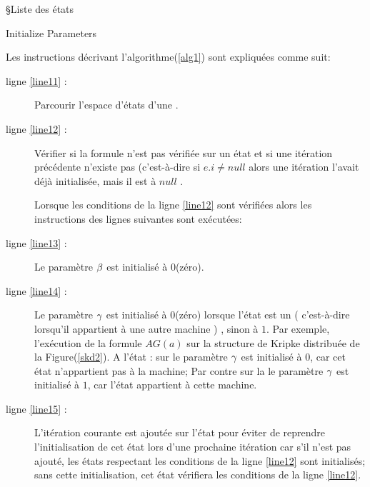 \begin{algorithm}[H]
\SetAlgoLined
{}
\S{Liste des états}
 \caption{Initialize Parameters}\label{alg1}
\end{algorithm}
Les instructions décrivant l'algorithme(\ref{alg1}) sont expliquées comme suit:
\begin{description}
	\item[ligne \ref{line11} :] Parcourir l'espace d'états d'une \mi{}.
	\item[ligne \ref{line12} :] Vérifier si la formule n'est pas vérifiée sur un état et si une itération précédente n'existe pas (c'est-à-dire si $ e.i\ne null$ alors une itération l'avait déjà initialisée, mais il est à $ null$ . 
	
	Lorsque les conditions de la ligne \ref{line12} sont vérifiées alors les instructions des lignes suivantes sont exécutées:
	\item[ligne \ref{line13} :] Le paramètre $\beta{}$ est initialisé à $0$(zéro).
	\item[ligne \ref{line14} :] Le paramètre $\gamma{}$ est initialisé à $0$(zéro) lorsque l'état est un \textsl{\border{}} ( c'est-à-dire lorsqu'il appartient à une autre machine ) , sinon à $1$. Par exemple, l'exécution de la formule  \textit{$AG(a)$} sur la structure de Kripke distribuée de la Figure(\ref{skd2}). A l'état \sneuf{} : sur \mone{}  le paramètre $\gamma{}$ est initialisé à $0$, car cet état n'appartient pas à la machine;  Par contre sur la \mtwo{} le paramètre $\gamma{}$ est initialisé à $1$, car l'état appartient à cette machine.
	\item[ligne \ref{line15} :] L'itération courante est ajoutée sur l'état pour éviter de reprendre l'initialisation de cet état lors d'une prochaine itération car s'il n'est pas ajouté, les états respectant les conditions de la ligne \ref{line12} sont initialisés; sans cette initialisation, cet état vérifiera les conditions de la ligne \ref{line12}. 
\end{description}
